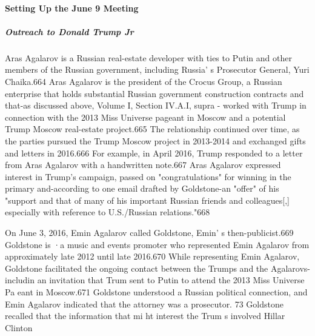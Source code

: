 \paragraph{Setting Up the June 9 Meeting}

\subparagraph{Outreach to Donald Trump Jr}

Aras Agalarov is a  Russian real-estate developer  with ties to Putin and other members of the Russian government, including Russia' s Prosecutor General, Yuri Chaika.664 Aras Agalarov is the president of the Crocus Group,  a Russian enterprise that holds substantial Russian government construction contracts and that-as discussed above, Volume I, Section IV.A.I, supra - worked with Trump in connection with the 2013 Miss Universe pageant in Moscow and a potential Trump Moscow real-estate project.665 The relationship continued over time, as the parties pursued the Trump Moscow project in 2013-2014 and exchanged gifts and letters in 2016.666 For example, in April 2016,  Trump responded to a  letter from Aras Agalarov with a  handwritten note.667 Aras Agalarov expressed interest in Trump's campaign, passed on "congratulations" for winning in the primary and-according to one email drafted by Goldstone-an "offer" of his "support and that of many of his important Russian friends and colleagues[,] especially with reference to U.S./Russian relations."668

On June 3, 2016, Emin Agalarov called Goldstone, Emin' s then-publicist.669 Goldstone is ·a music and events promoter who represented Emin Agalarov from approximately late 2012 until late  2016.670 While representing Emin Agalarov, Goldstone facilitated the ongoing contact between the Trumps and the Agalarovs-includin an invitation that Trum sent to Putin to attend the 2013 Miss Universe Pa eant in Moscow.671 Goldstone understood a Russian political connection, and Emin Agalarov indicated that the attorney was a prosecutor. 73 Goldstone recalled that the information that mi ht interest the Trum s  involved Hillar Clinton

